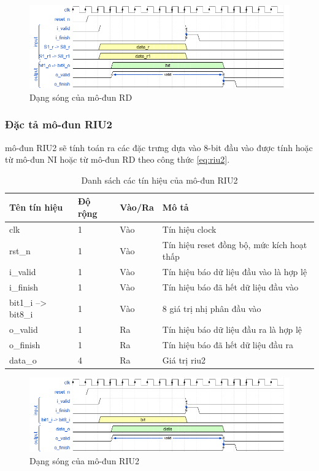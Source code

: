 \begin{figure}[!ht]
    \centering
    \includegraphics[width=\linewidth]{figures/rd.png}
    \caption{Dạng sóng của mô-đun RD}
    \label{fig:rd}
\end{figure}
\newpage
\subsubsection{Đặc tả mô-đun RIU2}
mô-đun RIU2 sẽ tính toán ra các đặc trưng dựa vào 8-bit đầu vào được tính hoặc từ mô-đun NI hoặc từ mô-đun RD theo công thức \ref{eq:riu2}.
\begin{table}[!ht]
    \centering
    \renewcommand{\arraystretch}{1.3} %
        \caption{Danh sách các tín hiệu của mô-đun RIU2}
    \begin{tabular}{|p{3cm} p{2cm} p{2cm} p{8cm}|}
        \hline
        \rowcolor{gray!30}
        \textbf{Tên tín hiệu} & \textbf{Độ rộng} & \textbf{Vào/Ra} & \textbf{Mô tả} \\
        \hline
        clk & 1 & Vào & Tín hiệu clock \\
        \hline
        rst\_n & 1 & Vào & Tín hiệu reset đồng bộ, mức kích hoạt thấp \\
        \hline
        i\_valid & 1 & Vào & Tín hiệu báo dữ liệu đầu vào là hợp lệ \\
        \hline
        i\_finish & 1 & Vào & Tín hiệu báo đã hết dữ liệu đầu vào \\
        \hline
        bit1\_i --> bit8\_i & 1 & Vào & 8 giá trị nhị phân đầu vào\\
        \hline
        o\_valid & 1 & Ra & Tín hiệu báo dữ liệu đầu ra là hợp lệ\\
        \hline
        o\_finish & 1 & Ra & Tín hiệu báo đã hết dữ liệu đầu ra \\
        \hline
        data\_o & 4 & Ra & Giá trị riu2 \\
        \hline
    \end{tabular}

    \label{tab:signalListRIU2}
\end{table}
\begin{figure}[!ht]
    \centering
    \includegraphics[width=\linewidth]{figures/riu2.png}
    \caption{Dạng sóng của mô-đun RIU2}
    \label{fig:riu2}
\end{figure}
